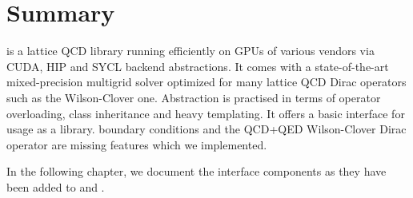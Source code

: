 \section{Summary}
\label{sec:quda:summary}


\Quda is a lattice QCD library running efficiently on GPUs of various vendors via CUDA, HIP and SYCL backend abstractions.
It comes with a state-of-the-art mixed-precision multigrid solver optimized for many lattice QCD Dirac operators such as the Wilson-Clover one.
Abstraction is practised in terms of operator overloading, class inheritance and heavy templating.
It offers a basic interface for usage as a library.
\Cstar boundary conditions and the QCD+QED Wilson-Clover Dirac operator are missing features which we implemented.

In the following chapter, we document the interface components as they have been added to \openqxd and \quda.
